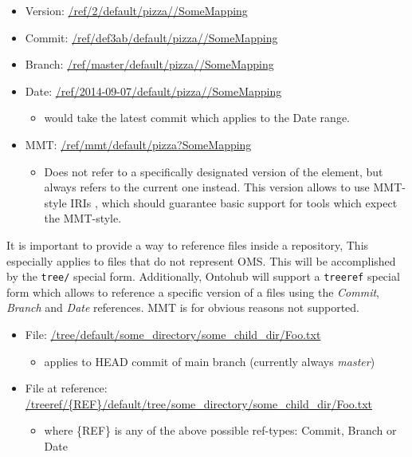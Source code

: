 \documentclass[10pt, a4paper]{isov2}
\begin{document}
\begin{itemize}
  \item Version: \url{/ref/2/default/pizza//SomeMapping}
  \item Commit: \url{/ref/def3ab/default/pizza//SomeMapping}
  \item Branch: \url{/ref/master/default/pizza//SomeMapping}
  \item Date: \url{/ref/2014-09-07/default/pizza//SomeMapping}
    \begin{itemize}
      \item would take the latest commit which applies to the Date range.
    \end{itemize}
  \item MMT: \url{/ref/mmt/default/pizza?SomeMapping}
    \begin{itemize}
      \item Does not refer to a specifically designated version of the element,
        but always refers to the current one instead. This version allows to
        use MMT-style IRIs \cite{RabKoh:WSMSML13}, 
        which should guarantee basic support for tools
        which expect the MMT-style.
    \end{itemize}
\end{itemize}



 It is important to provide a way to reference files inside a repository,
This especially applies to files that do not represent OMS. This
will be accomplished by the \texttt{tree/} special form. Additionally,
 Ontohub will support a \texttt{treeref} special form which allows to reference
a specific version of a files using the \emph{Commit}, \emph{Branch} and
\emph{Date} references. MMT is for obvious reasons not supported.

\begin{itemize}
  \item File: \url{/tree/default/some_directory/some_child_dir/Foo.txt}
    \begin{itemize}
      \item applies to HEAD commit of main branch (currently always \emph{master})
    \end{itemize}
  \item File at reference: \url{/treeref/{REF}/default/tree/some_directory/some_child_dir/Foo.txt}
    \begin{itemize}
      \item where \{REF\} is any of the above possible ref-types: Commit, Branch or Date
    \end{itemize}
\end{itemize}
\end{document}
